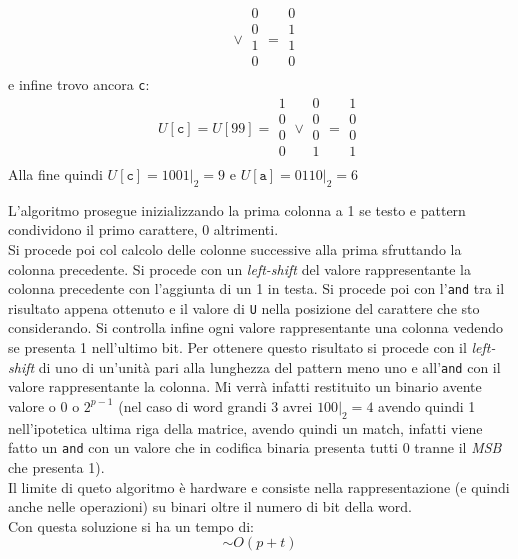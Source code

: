 \documentclass[a4paper,12pt, oneside]{article}
\begin{document}
\begin{esempio}
\[\begin{matrix}
    \end{matrix}\vee
    \begin{matrix}
      0\\
      0\\
      1\\
      0\\
    \end{matrix}=
    \begin{matrix}
      0\\
      1\\
      1\\
      0\\
    \end{matrix}
  \]
  e infine trovo ancora \texttt{c}:
  \[
    U[\mathtt{c}]=U[99]=
    \begin{matrix}
      1\\
      0\\
      0\\
      0\\
    \end{matrix}\vee
    \begin{matrix}
      0\\
      0\\
      0\\
      1\\
    \end{matrix}=
    \begin{matrix}
      1\\
      0\\
      0\\
      1\\
    \end{matrix}
  \]
  Alla fine quindi $U[\mathtt{c}]=1001|_2=9$ e $U[\mathtt{a}]=0110|_2=6$
\end{esempio}
L'algoritmo prosegue inizializzando la prima colonna a 1 se testo e
pattern condividono il primo carattere, 0 altrimenti.\\
Si procede poi col calcolo delle colonne successive alla prima
sfruttando la colonna precedente. Si procede con un
\textit{left-shift} del valore rappresentante la colonna precedente
con l'aggiunta di un 1 in testa. Si procede poi con l'\texttt{and} tra
il risultato appena ottenuto e il valore di \texttt{U} nella posizione
del carattere che sto considerando. Si controlla infine ogni valore
rappresentante una colonna vedendo se presenta 1 nell'ultimo bit. Per
ottenere questo risultato si procede con il \textit{left-shift} di uno
di un'unità pari alla lunghezza del pattern meno uno e
all'\texttt{and} con il valore rappresentante la colonna. Mi verrà
infatti restituito un binario avente valore o 0 o $2^{p-1}$ (nel caso di
word grandi 3 avrei $100|_2=4$ avendo quindi 1 nell'ipotetica ultima
riga della matrice, avendo quindi un match, infatti viene fatto un
\texttt{and} con un valore che in codifica binaria presenta tutti 0
tranne il \textit{MSB} che presenta 1).\\
Il limite di queto algoritmo è hardware e consiste nella
rappresentazione (e quindi anche nelle operazioni) su binari oltre il
numero di bit della word.\\
Con questa soluzione si ha un tempo di:
\[\sim O(p + t)\]
\end{document}
